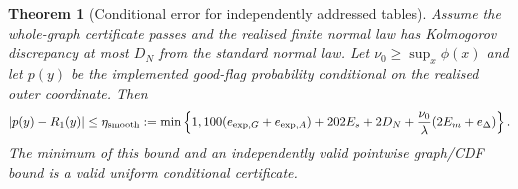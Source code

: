 \documentclass[11pt]{article}
\newtheorem{theorem}{Theorem}
\begin{document}
\begin{theorem}[Conditional error for independently addressed tables]
\label{thm:raw-asymmetric-conditional}
Assume the whole-graph certificate passes and the realised finite normal
law has Kolmogorov discrepancy at most $D_N$ from the standard normal
law. Let $\nu_0\geq\sup_x\phi(x)$ and let $p(y)$ be the implemented
good-flag probability conditional on the realised outer coordinate. Then
\begin{equation}
 |p(y)-R_1(y)|\leq\eta_{\rm smooth}:=
 \min\left\{1,100(e_{\exp,G}+e_{\exp,A})+202E_s+2D_N+
       \frac{\nu_0}{\lambda}(2E_m+e_\Delta)\right\}.
\end{equation}
The minimum of this bound and an independently valid pointwise
graph/CDF bound is a valid uniform conditional certificate.
\end{theorem}
\end{document}
